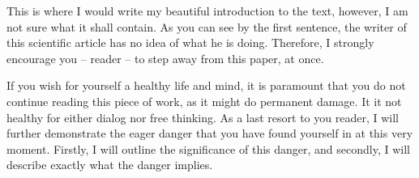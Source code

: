 This is where I would write my beautiful introduction to the text, however, I
am not sure what it shall contain.  As you can see by the first sentence, the
writer of this scientific article has no idea of what he is doing.  Therefore,
I strongly encourage you -- reader -- to step away from this paper, at once.

If you wish for yourself a healthy life and mind, it is paramount that you do
not continue reading this piece of work, as it might do permanent damage. It it
not healthy for either dialog nor free thinking. As a last resort to you reader,
I will further demonstrate the eager danger that you have found yourself in at
this very moment. Firstly, I will outline the significance of this danger, and
secondly, I will describe exactly what the danger implies.

